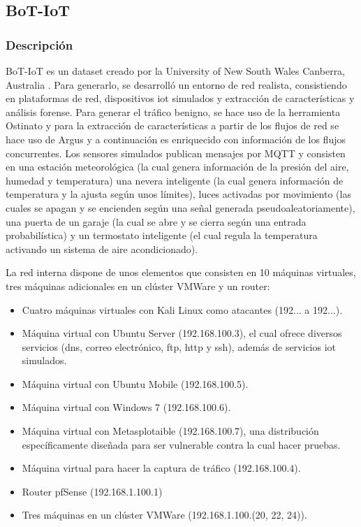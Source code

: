 
\subsection{BoT-IoT}

\subsubsection{Descripción}

BoT-IoT es un dataset creado por la University of New South Wales Canberra, Australia \cite{DBLP:journals/corr/abs-1811-00701}. Para generarlo, se desarrolló un entorno de red realista, consistiendo en plataformas de red, dispositivos \acrshort{iot} simulados y extracción de características y análisis forense. Para generar el tráfico benigno, se hace uso de la herramienta Ostinato \cite{ostinato} y para la extracción de características a partir de los flujos de red se hace uso de Argus \cite{argustool} y a continuación es enriquecido con información de los flujos concurrentes. Los sensores simulados publican mensajes por MQTT y consisten en una estación meteorológica (la cual genera información de la presión del aire, humedad y temperatura) una nevera inteligente (la cual genera información de temperatura y la ajusta según unos límites), luces activadas por movimiento (las cuales se apagan y se encienden según una señal generada pseudoaleatoriamente), una puerta de un garaje (la cual se abre y se cierra según una entrada probabilística) y un termostato inteligente (el cual regula la temperatura activando un sistema de aire acondicionado).

La red interna dispone de unos elementos que consisten en 10 máquinas virtuales, tres máquinas adicionales en un clúster VMWare y un router:

\begin{itemize}
    \item Cuatro máquinas virtuales con Kali Linux como atacantes (192... a 192...).
    \item Máquina virtual con Ubuntu Server (192.168.100.3), el cual ofrece diversos servicios (\acrshort{dns}, correo electrónico, \acrshort{ftp}, \acrshort{http} y \acrshort{ssh}), además de servicios \acrshort{iot}  simulados.
    \item Máquina virtual con Ubuntu Mobile (192.168.100.5).
    \item Máquina virtual con Windows 7 (192.168.100.6).
    \item Máquina virtual con Metasplotaible (192.168.100.7), una distribución específicamente diseñada para ser vulnerable contra la cual hacer pruebas.
    \item Máquina virtual para hacer la captura de tráfico (192.168.100.4).
    \item Router pfSense (192.168.1.100.1)
    \item Tres máquinas en un clúster VMWare (192.168.1.100.(20, 22, 24)).
\end{itemize}


